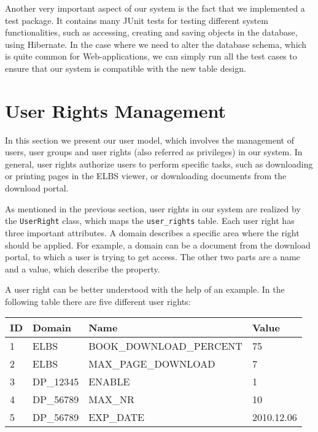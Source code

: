Another very important aspect of our system is the fact that we implemented a test package.
It contains many JUnit tests for testing
different system functionalities, such as accessing, creating and saving 
objects in the database, using Hibernate. In the case where we need to alter the database schema, which is quite
common for Web-applications, we can simply run all the test cases to ensure that our system is compatible
with the new table design.  

\section{User Rights Management}
\label{sec:userrights}
In this section we present our user model, which involves the management of 
users, user groups and user rights (also referred as privileges) in our system. 
In general, user rights authorize users to perform specific tasks, such as 
downloading or printing pages in the ELBS viewer, or downloading documents from the download portal. 

As mentioned in the previous section, user rights in our system are realized by the \verb=UserRight= class,
which maps the \verb=user_rights= table. Each user right has three important attributes. 
A domain describes a specific area where the right should be applied.
For example, a domain can be a document from the download portal, to which a user is trying to get access. 
The other two parts are a name and a value, which describe the property.

A user right can be better understood with the help of an example. 
In the following table there are five different user rights:
	
\begin{center}
\begin{tabular}[h]{|l|l|l|l|}
  \hline
  ID & Domain & Name & Value \\ \hline
  1 & ELBS & BOOK\_DOWNLOAD\_PERCENT & 75 \\  
  2 & ELBS & MAX\_PAGE\_DOWNLOAD & 7 \\
  3 & DP\_12345 & ENABLE & 1  \\ 
  4 & DP\_56789 & MAX\_NR & 10  \\
  5 & DP\_56789 & EXP\_DATE & 2010.12.06  \\ \hline
\end{tabular}
\end{center}

